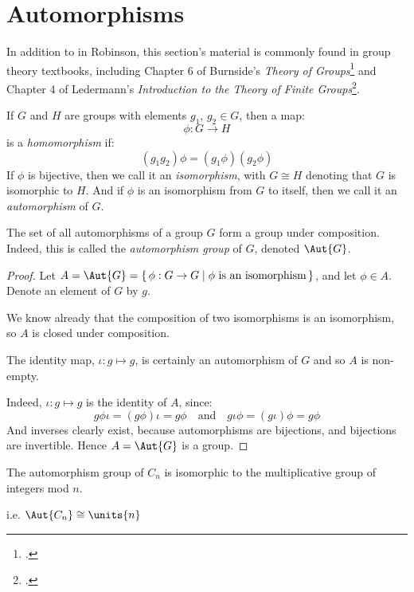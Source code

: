 \section{Automorphisms}
In addition to in Robinson, this section's material is commonly found in group theory textbooks, including Chapter 6 of
Burnside's \textit{Theory of Groups}\footcite[Ch. 6]{burnside1911} and Chapter 4 of Ledermann's \textit{Introduction to
the Theory of Finite Groups}\footcite[Ch. 4]{ledermann1961}.

\begin{definition}
    \raggedright
    If \(G\) and \(H\) are groups with elements \(g_1,\, g_2 \in G\), then a map:
    \[\phi:G \to H\]
    is a \emph{homomorphism} if:
    \[(g_1 g_2)\phi = (g_1\phi)(g_2\phi)\]
    If \(\phi\) is bijective, then we call it an \emph{isomorphism}, with \(G \cong H\) denoting that \(G\) is
    isomorphic to \(H\).
    And if \(\phi\) is an isomorphism from \(G\) to itself, then we call it an \emph{automorphism} of
    \(G\).
\end{definition}

\begin{lemma}
    \raggedright
    The set of all automorphisms of a group \(G\) form a group under composition.
    Indeed, this is called the \emph{automorphism group} of \(G\), denoted \(\Aut{G}\).
\end{lemma}

\begin{proof}
    Let \(A = \Aut{G} = \{\,\phi:G \to G \mid \phi\ \text{is an isomorphism}\,\}\), and let \(\phi \in A\).
    Denote an element of \(G\) by \(g\).

    We know already that the composition of two isomorphisms is an isomorphism, so \(A\) is closed under composition.

    The identity map, \(\iota:g \mapsto g\), is certainly an automorphism of \(G\) and so \(A\) is non-empty.

    Indeed, \(\iota:g \mapsto g\) is the identity of \(A\), since:
    \[g\phi\iota = (g\phi)\iota = g\phi \quad \text{and} \quad g\iota\phi = (g\iota)\phi = g\phi\]
    And inverses clearly exist, because automorphisms are bijections, and bijections are invertible.
    Hence \(A = \Aut{G}\) is a group.
\end{proof}

\begin{lemma}\label{lem:aut}
    \raggedright
    The automorphism group of \(C_n\) is isomorphic to the multiplicative group
    of integers mod \(n\).

    i.e. \(\Aut{C_n} \cong \units{n}\)
\end{lemma}

